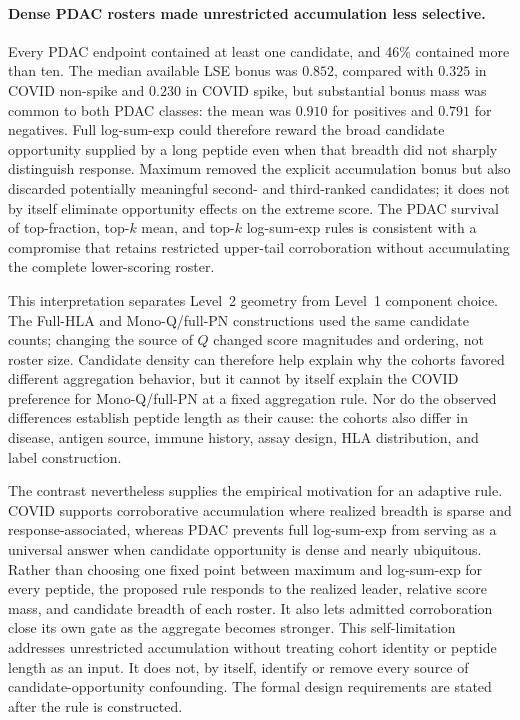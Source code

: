 \documentclass[11pt]{article}
\begin{document}
\paragraph{Dense PDAC rosters made unrestricted accumulation less selective.}
Every PDAC endpoint contained at least one candidate, and 46\% contained more
than ten. The median available LSE bonus was $0.852$, compared with $0.325$ in
COVID non-spike and $0.230$ in COVID spike, but substantial bonus mass was
common to both PDAC classes: the mean was $0.910$ for positives and $0.791$
for negatives. Full log-sum-exp could therefore reward the broad candidate
opportunity supplied by a long peptide even when that breadth did not sharply
distinguish response. Maximum removed the explicit accumulation bonus but also
discarded potentially meaningful second- and third-ranked candidates; it does
not by itself eliminate opportunity effects on the extreme score. The PDAC
survival of top-fraction, top-$k$ mean, and top-$k$ log-sum-exp rules is
consistent with a compromise that retains restricted upper-tail corroboration
without accumulating the complete lower-scoring roster.

This interpretation separates Level~2 geometry from Level~1 component choice.
The Full-HLA and Mono-Q/full-PN constructions used the same candidate counts;
changing the source of $Q$ changed score magnitudes and ordering, not roster
size. Candidate density can therefore help explain why the cohorts favored
different aggregation behavior, but it cannot by itself explain the COVID
preference for Mono-Q/full-PN at a fixed aggregation rule. Nor do the observed
differences establish peptide length as their cause: the cohorts also differ
in disease, antigen source, immune history, assay design, HLA distribution,
and label construction.

The contrast nevertheless supplies the empirical motivation for an adaptive
rule. COVID supports corroborative accumulation where realized breadth is
sparse and response-associated, whereas PDAC prevents full log-sum-exp from
serving as a universal answer when candidate opportunity is dense and nearly
ubiquitous. Rather than choosing one fixed point between maximum and
log-sum-exp for every peptide, the proposed rule responds to the realized
leader, relative score mass, and candidate breadth of each roster. It also
lets admitted corroboration close its own gate as the aggregate becomes
stronger. This self-limitation addresses unrestricted accumulation without
treating cohort identity or peptide length as an input. It does not, by
itself, identify or remove every source of candidate-opportunity confounding.
The formal design requirements are stated after the rule is constructed.
\end{document}
